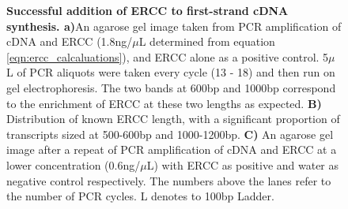 \begin{figure}[!htp]
\begin{center}
	\end{center}
	\captionsetup{width=0.95\textwidth}
	\caption[ERCC usage to benchmark library preparation and sequencing performance runs]%
	{\textbf{Successful addition of ERCC to first-strand cDNA synthesis. a)}An agarose gel image taken from PCR amplification of cDNA and ERCC (1.8ng/$\mu$L determined from equation \ref{eqn:ercc_calcaluations}), and ERCC alone as a positive control. 5$\mu$L of PCR aliquots were taken every cycle (13 - 18) and then run on gel electrophoresis. The two bands at 600bp and 1000bp correspond to the enrichment of ERCC at these two lengths as expected. \textbf{B)} Distribution of known ERCC length, with a significant proportion of transcripts sized at 500-600bp and 1000-1200bp. \textbf{C)} An agarose gel image after a repeat of PCR amplification of cDNA and ERCC at a lower concentration (0.6ng/$\mu$L) with ERCC as positive and water as negative control respectively. The numbers above the lanes refer to the number of PCR cycles. L denotes to 100bp Ladder.}
	\label{fig:ercc_lab_gel}
\end{figure}
 
